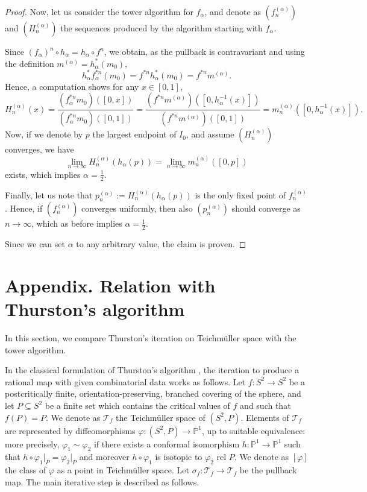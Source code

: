 \documentclass[11pt]{amsart}
\begin{document}
\begin{proof}
Now, let us consider the tower algorithm for $f_\alpha$, and denote as $(f^{(\alpha)}_n)$ and $(H_n^{(\alpha)})$
the sequences produced by the algorithm starting with $f_\alpha$. 

Since $(f_\alpha)^n \circ h_\alpha = h_\alpha \circ f^n$, we obtain, as the pullback is contravariant
and using the definition $m^{(\alpha)} = h_\alpha^* (m_0)$, 
$$h_\alpha^*  f_\alpha^{*n} (m_0) = f^{*n}  h_\alpha^* (m_0) = f^{*n} m^{(\alpha)}. $$ 
Hence, a computation shows for any $x \in [0, 1]$, 
$$H_n^{(\alpha)}(x) = \frac{(f^{* n}_\alpha m_0)([0, x])}{(f^{* n}_\alpha m_0)([0, 1])} =  \frac{(f^{* n} m^{(\alpha)})([0, h_\alpha^{-1}(x)])}{(f^{* n}m^{(\alpha)})([0, 1])}  = m_n^{(\alpha)}([0, h_\alpha^{-1}(x)]).$$
Now, if we denote by $p$ the largest endpoint of $I_0$, and assume $(H_n^{(\alpha)})$ converges, we have 
$$\lim_{n \to \infty} H_n^{(\alpha)}(h_\alpha(p)) = \lim_{n \to \infty} m^{(\alpha)}_n([0, p])$$
exists, which implies $\alpha = \frac{1}{2}$. 

Finally, let us note that $p_n^{(\alpha)} := H_n^{(\alpha)}(h_\alpha(p))$ is the only fixed point of $f_n^{(\alpha)}$. 
Hence, if $(f_n^{(\alpha)})$ converges uniformly, then also $(p_n^{(\alpha)})$ should converge as $n \to \infty$, 
which as before implies $\alpha = \frac{1}{2}$. 

Since we can set $\alpha$ to any arbitrary value, the claim is proven. 
\end{proof}


\section*{Appendix. Relation with Thurston's algorithm} \label{appendix}

In this section, we compare Thurston's iteration on Teichm\"uller space with the tower algorithm. 

In the classical formulation of Thurston's algorithm \cite{DH}, the iteration to produce a rational map 
with given combinatorial data works as follows.
Let $f : S^2 \to S^2$ be a postcritically finite, orientation-preserving, branched covering of the sphere, and let $P \subseteq S^2$ be a finite set which contains the critical values of $f$ and such that $f(P) = P$. 
We denote as $\mathcal{T}_f$ the Teichm\"uller space of $(S^2, P)$. 
Elements of $\mathcal{T}_f$ are represented by diffeomorphisms $\varphi : (S^2, P) \to \mathbb{P}^1$, up to suitable equivalence: more precisely, $\varphi_1 \sim \varphi_2$ if there exists a conformal isomorphism $h : \mathbb{P}^1 \to \mathbb{P}^1$ such that $h \circ \varphi_1 \vert_{P}= \varphi_2 \vert_{P}$ and moreover $h \circ \varphi_1$ is isotopic to $\varphi_2$ rel $P$.
We denote as $[\varphi]$ the class of $\varphi$ as a point in Teichm\"uller space.
Let $\sigma_f : \mathcal{T}_f \to \mathcal{T}_f$ be the pullback map. 
The main iterative step is described as follows.
\end{document}
